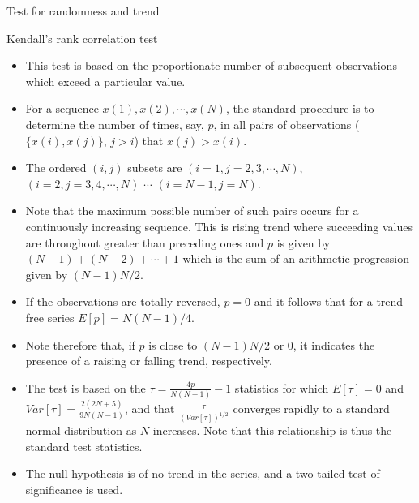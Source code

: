 \documentclass[8pt]{beamer}
\renewcommand{\emph}[1]{\textcolor{myorange}{#1}}
\begin{document}
\begin{frame}{Test for randomness and trend}
\begin{block}{Kendall's rank correlation test}
\end{block}
    \begin{itemize}
        \item This test is based on the proportionate number of subsequent observations which exceed a particular value. 
        \item For a sequence $x(1), x(2), \cdots, x(N)$, the standard procedure is to determine the number of times, say, $p$, in all pairs of observations ($\{x(i),x(j)\}$, $j>i$) that $x(j)>x(i)$. 
        \item The ordered $(i,j)$ subsets are $(i=1, j=2,3,\cdots,N)$, $(i=2, j=3,4,\cdots,N)$ $\cdots$ $(i=N-1, j=N)$. 
        \item Note that the \emph{maximum possible number} of such pairs occurs for a continuously increasing sequence. This is \emph{rising trend} where succeeding values are throughout greater than preceding ones and $p$ is given by $(N-1)+(N-2)+ \cdots + 1$ which is the sum of an arithmetic progression given by $(N-1)N/2$.
        \item If the observations are totally reversed, $p=0$ and it follows that for a \emph{trend-free series} $E[p] = N(N-1)/4$. 
        \item Note therefore that, if $p$ is close to $(N-1)N/2$ or 0, it indicates the presence  of a \emph{raising} or \emph{falling} trend, respectively. 
        \item The test is based on the $\tau = \frac{4p}{N(N-1)} -1 $ statistics for which $E[\tau] =0$ and $Var[\tau] = \frac{2(2N+5)}{9N(N-1)}$, and that $\frac{\tau}{(Var[\tau])^{1/2}}$ converges rapidly to a \emph{standard normal distribution} as $N$ increases. Note that this relationship is thus the \emph{standard test statistics}. 
        \item The \emph{null hypothesis} is of \emph{no trend} in the series, and a \emph{two-tailed test of significance is used}. 
    \end{itemize}
\end{frame}
 
\end{document}
